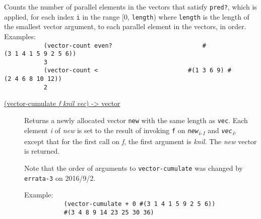 \begin{description}
\tightlist
\item[ \href{}{(vector-count \emph{pred? vec\textsubscript{1}
vec\textsubscript{2} \ldots{}}) -\textgreater{} exact nonnegative
integer} ]
Counts the number of parallel elements in the vectors that satisfy
\texttt{pred?}, which is applied, for each index \texttt{i} in the range
{[}0, \texttt{length}) where \texttt{length} is the length of the
smallest vector argument, to each parallel element in the vectors, in
order.\\[2\baselineskip]Examples:\\[2\baselineskip]\texttt{\ \ \ \ \ \ \ \ \ \ \ (vector-count\ even?\ \ \ \ \ \ \ \ \ \ \ \ \ \ \ \ \ \ \ \ \ \ \ \ \ \textquotesingle{}\#(3\ 1\ 4\ 1\ 5\ 9\ 2\ 5\ 6))\ \ \ \ \ \ \ \ \ }\\
\texttt{\ \ \ \ \ \ \ \ \ \ \ 3\ \ \ \ \ \ \ \ \ }\\[2\baselineskip]\texttt{\ \ \ \ \ \ \ \ \ \ \ (vector-count\ \textless{}\ \ \ \ \ \ \ \ \ \ \ \ \ \ \ \ \ \ \ \ \ \ \ \ \ \textquotesingle{}\#(1\ 3\ 6\ 9)\ \textquotesingle{}\#(2\ 4\ 6\ 8\ 10\ 12))\ \ \ \ \ \ \ \ \ }\\
\texttt{\ \ \ \ \ \ \ \ \ \ \ 2\ \ \ \ \ \ \ \ \ }\\[2\baselineskip]
\end{description}

\begin{description}
\item[ \href{}{(vector-cumulate \emph{f knil vec}) -\textgreater{}
vector} ]
Returns a newly allocated vector \texttt{new} with the same length as
\texttt{vec}. Each element \emph{i} of \emph{new} is set to the result
of invoking \texttt{f} on \emph{\texttt{new}\textsubscript{i-1}} and
\emph{\texttt{vec}\textsubscript{i}}, except that for the first call on
\emph{f}, the first argument is \emph{knil}. The \emph{new} vector is
returned.

Note that the order of arguments to \texttt{vector-cumulate} was changed
by \texttt{errata-3} on 2016/9/2.

Example:\\[2\baselineskip]\texttt{\ \ \ \ \ \ \ \ \ \ \ (vector-cumulate\ +\ 0\ \textquotesingle{}\#(3\ 1\ 4\ 1\ 5\ 9\ 2\ 5\ 6))\ \ \ \ \ \ \ \ \ }\\
\texttt{\ \ \ \ \ \ \ \ \ \ \ \#(3\ 4\ 8\ 9\ 14\ 23\ 25\ 30\ 36)\ \ \ \ \ \ \ \ \ }\\[4\baselineskip]
\end{description}

